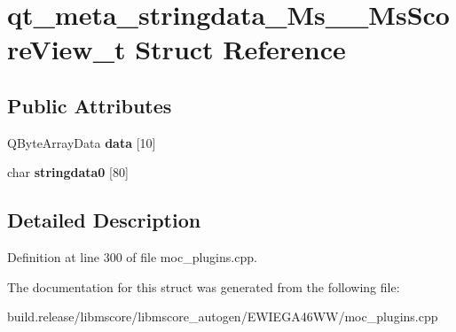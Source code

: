 \hypertarget{structqt__meta__stringdata___ms_____ms_score_view__t}{}\section{qt\+\_\+meta\+\_\+stringdata\+\_\+\+Ms\+\_\+\+\_\+\+Ms\+Score\+View\+\_\+t Struct Reference}
\label{structqt__meta__stringdata___ms_____ms_score_view__t}
\subsection*{Public Attributes}
\begin{DoxyCompactItemize}
\item 
\mbox{\label{structqt__meta__stringdata___ms_____ms_score_view__t_af38b126bafddcaca6533bf7fa2c9984e}} 
Q\+Byte\+Array\+Data {\bfseries data} \mbox{[}10\mbox{]}
\item 
\mbox{\label{structqt__meta__stringdata___ms_____ms_score_view__t_a7fee729c506742040d7c90b277639a5c}} 
char {\bfseries stringdata0} \mbox{[}80\mbox{]}
\end{DoxyCompactItemize}


\subsection{Detailed Description}


Definition at line 300 of file moc\+\_\+plugins.\+cpp.



The documentation for this struct was generated from the following file\+:\begin{DoxyCompactItemize}
\item 
build.\+release/libmscore/libmscore\+\_\+autogen/\+E\+W\+I\+E\+G\+A46\+W\+W/moc\+\_\+plugins.\+cpp\end{DoxyCompactItemize}
